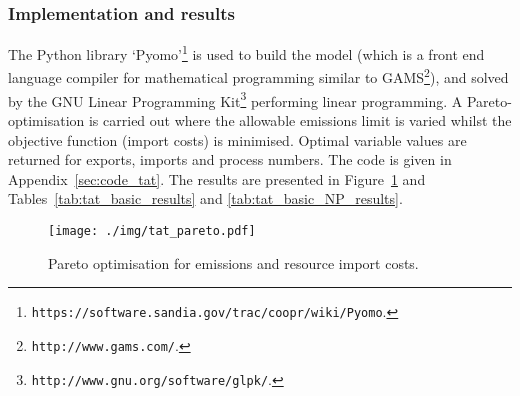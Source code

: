 \subsubsection*{Implementation and results}
The Python library `Pyomo'\footnote{\texttt{https://software.sandia.gov/trac/coopr/wiki/Pyomo}.} is used to build the model (which is a front end language compiler for mathematical programming similar to GAMS\footnote{\texttt{http://www.gams.com/}.}), and solved by the GNU Linear Programming Kit\footnote{\texttt{http://www.gnu.org/software/glpk/}.} performing linear programming. A Pareto-optimisation is carried out where the allowable emissions limit is varied whilst the objective function (import costs) is minimised. Optimal variable values are returned for exports, imports and process numbers. The code is given in Appendix~\ref{sec:code_tat}. The results are presented in Figure~\ref{fig:tat_pareto} and Tables~\ref{tab:tat_basic_results} and \ref{tab:tat_basic_NP_results}.
\begin{figure}
	\centering
	\texttt{[image: ./img/tat\_pareto.pdf]}
	\caption{Pareto optimisation for emissions and resource import costs.} \label{fig:tat_pareto}
\end{figure}
 
 

